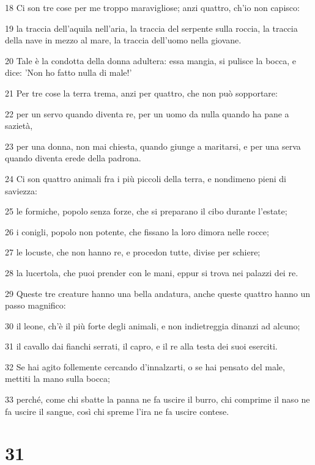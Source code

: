 \par 18 Ci son tre cose per me troppo maravigliose; anzi quattro, ch'io non capisco:
\par 19 la traccia dell'aquila nell'aria, la traccia del serpente sulla roccia, la traccia della nave in mezzo al mare, la traccia dell'uomo nella giovane.
\par 20 Tale è la condotta della donna adultera: essa mangia, si pulisce la bocca, e dice: 'Non ho fatto nulla di male!'
\par 21 Per tre cose la terra trema, anzi per quattro, che non può sopportare:
\par 22 per un servo quando diventa re, per un uomo da nulla quando ha pane a sazietà,
\par 23 per una donna, non mai chiesta, quando giunge a maritarsi, e per una serva quando diventa erede della padrona.
\par 24 Ci son quattro animali fra i più piccoli della terra, e nondimeno pieni di saviezza:
\par 25 le formiche, popolo senza forze, che si preparano il cibo durante l'estate;
\par 26 i conigli, popolo non potente, che fissano la loro dimora nelle rocce;
\par 27 le locuste, che non hanno re, e procedon tutte, divise per schiere;
\par 28 la lucertola, che puoi prender con le mani, eppur si trova nei palazzi dei re.
\par 29 Queste tre creature hanno una bella andatura, anche queste quattro hanno un passo magnifico:
\par 30 il leone, ch'è il più forte degli animali, e non indietreggia dinanzi ad alcuno;
\par 31 il cavallo dai fianchi serrati, il capro, e il re alla testa dei suoi eserciti.
\par 32 Se hai agito follemente cercando d'innalzarti, o se hai pensato del male, mettiti la mano sulla bocca;
\par 33 perché, come chi sbatte la panna ne fa uscire il burro, chi comprime il naso ne fa uscire il sangue, così chi spreme l'ira ne fa uscire contese.

\chapter{31}

